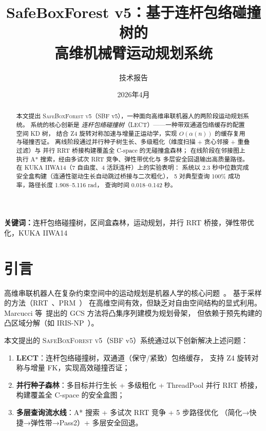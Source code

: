 \documentclass[11pt,a4paper]{article}
\title{SafeBoxForest v5：基于连杆包络碰撞树的\\高维机械臂运动规划系统}
\author{技术报告}
\date{2026年4月}
\begin{document}
\maketitle

\begin{abstract}
本文提出 \textsc{SafeBoxForest v5}（SBF v5），一种面向高维串联机器人的两阶段运动规划系统。
系统的核心创新是 \emph{连杆包络碰撞树}（LECT）——一种带双通道包络缓存的配置空间 KD 树，
结合 Z4 旋转对称加速与增量正运动学，实现 $O(\alpha(n))$ 的缓存复用与碰撞否证。
离线阶段通过并行种子树生长、多级粗化（维度扫描 + 贪心邻接 + 重叠过滤）与
并行 RRT 桥接构建覆盖全 C-space 的无碰撞盒森林；
在线阶段在邻接图上执行 A* 搜索，经由多试次 RRT 竞争、弹性带优化与
多层安全回退输出高质量路径。
在 KUKA IIWA14（7 自由度、4 活跃连杆）上的实验表明：
系统以 2.3 秒中位数完成安全盒构建（连通性驱动生长自动跳过桥接与二次粗化），
5 对典型查询 100\% 成功率，路径长度 1.908--5.116 rad，
查询时间 0.018--0.142 秒。
\end{abstract}

\noindent\textbf{关键词：}连杆包络碰撞树，区间盒森林，运动规划，并行 RRT 桥接，弹性带优化，KUKA IIWA14

\tableofcontents
\newpage


\section{引言}
\label{sec:intro}

高维串联机器人在复杂约束空间中的运动规划是机器人学的核心问题~\cite{lavalle2006planning}。
基于采样的方法（RRT~\cite{lavalle1998rapidly}、PRM~\cite{kavraki1996probabilistic}）
在高维空间有效，但缺乏对自由空间结构的显式利用。
Marcucci 等~\cite{marcucci2023motion}提出的 GCS 方法将凸集序列建模为规划骨架，
但依赖于预先构建的凸区域分解（如 IRIS-NP~\cite{werner2024fast}）。

本文提出的 \textsc{SafeBoxForest v5}（SBF v5）系统通过以下创新解决上述问题：

\begin{enumerate}[nosep]
  \item \textbf{LECT}：连杆包络碰撞树，双通道（保守/紧致）包络缓存，
        支持 Z4 旋转对称与增量 FK，实现高效碰撞否证；
  \item \textbf{并行种子森林}：多目标并行生长 + 多级粗化 + ThreadPool 并行 RRT 桥接，
        构建覆盖全 C-space 的安全盒图；
  \item \textbf{多层查询流水线}：A* 搜索 + 多试次 RRT 竞争 + 5 步路径优化
        （简化→快捷→弹性带→Pass2）+ 多层安全回退。
\end{enumerate}
\end{document}

